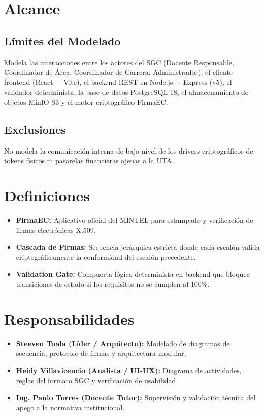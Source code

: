 \documentclass[12pt,a4paper]{article}
\begin{document}
\section{Alcance}

\subsection{Límites del Modelado}
Modela las interacciones entre los actores del SGC (Docente Responsable, Coordinador de Área, Coordinador de Carrera, Administrador), el cliente frontend (React + Vite), el backend REST en Node.js + Express (v5), el validador determinista, la base de datos PostgreSQL 18, el almacenamiento de objetos MinIO S3 y el motor criptográfico FirmaEC.

\subsection{Exclusiones}
No modela la comunicación interna de bajo nivel de los drivers criptográficos de tokens físicos ni pasarelas financieras ajenas a la UTA.

\section{Definiciones}
\begin{itemize}[leftmargin=1.5em, itemsep=2pt, topsep=2pt]
    \item \textbf{FirmaEC:} Aplicativo oficial del MINTEL para estampado y verificación de firmas electrónicas X.509.
    \item \textbf{Cascada de Firmas:} Secuencia jerárquica estricta donde cada escalón valida criptográficamente la conformidad del escalón precedente.
    \item \textbf{Validation Gate:} Compuerta lógica determinista en backend que bloquea transiciones de estado si los requisitos no se cumplen al 100\%.
\end{itemize}

\section{Responsabilidades}
\begin{itemize}[leftmargin=1.5em, itemsep=2pt, topsep=2pt]
    \item \textbf{Steeven Toala (Líder / Arquitecto):} Modelado de diagramas de secuencia, protocolo de firmas y arquitectura modular.
    \item \textbf{Heidy Villavicencio (Analista / UI-UX):} Diagrama de actividades, reglas del formato SGC y verificación de usabilidad.
    \item \textbf{Ing. Paulo Torres (Docente Tutor):} Supervisión y validación técnica del apego a la normativa institucional.
\end{itemize}
\end{document}

